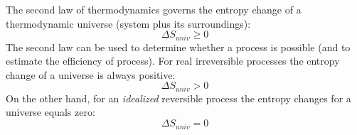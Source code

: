 \documentclass[11pt]{article}
\theoremstyle{definition}
\begin{document}
The second law of thermodynamics governs the entropy change of a thermodynamic universe (system plus its surroundings):
\begin{equation}
	\Delta{S}_{univ}\geq{0}
\end{equation}
The second law can be used to determine whether a process is possible (and to estimate the efficiency of process).
For real irreversible processes the entropy change of a universe is always positive:
\begin{equation}
	\Delta{S}_{univ} > 0
\end{equation}On the other hand, for an \textit{idealized} reversible process the entropy changes for a universe equals zero:
\begin{equation}
	\Delta{S}_{univ} = 0
\end{equation}


\end{document}
